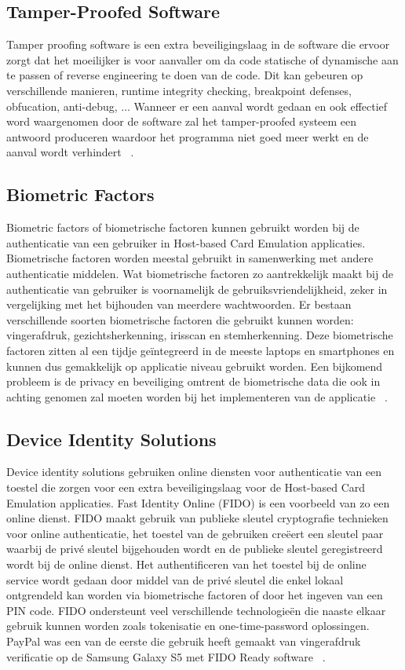 \subsection{Tamper-Proofed Software}
Tamper proofing software is een extra beveiligingslaag in de software die ervoor zorgt dat het moeilijker is voor aanvaller om da code statische of dynamische aan te passen of reverse engineering te doen van de code. Dit kan gebeuren op verschillende manieren, runtime integrity checking, breakpoint defenses,  obfucation, anti-debug, ... Wanneer er een aanval wordt gedaan en ook effectief word waargenomen door de software zal het tamper-proofed systeem een antwoord produceren waardoor het programma niet goed meer werkt en de aanval wordt verhindert ~\autocite{SCA2014}.

\subsection{Biometric Factors}
Biometric factors of biometrische factoren kunnen gebruikt worden bij de authenticatie van een gebruiker in Host-based Card Emulation applicaties. Biometrische factoren worden meestal gebruikt in samenwerking met andere authenticatie middelen. Wat biometrische factoren zo aantrekkelijk maakt bij de authenticatie van gebruiker is voornamelijk de gebruiksvriendelijkheid, zeker in vergelijking met het bijhouden van meerdere wachtwoorden. Er bestaan verschillende soorten biometrische factoren die gebruikt kunnen worden: vingerafdruk, gezichtsherkenning, irisscan en stemherkenning. Deze biometrische factoren zitten al een tijdje geïntegreerd in de meeste laptops en smartphones en kunnen dus gemakkelijk op applicatie niveau gebruikt worden. Een bijkomend probleem is de privacy en beveiliging omtrent de biometrische data die ook in achting genomen zal moeten worden bij het implementeren van de applicatie ~\autocite{SCA2014}.

\subsection{Device Identity Solutions}
Device identity solutions gebruiken online diensten voor authenticatie van een toestel die zorgen voor een extra beveiligingslaag voor de Host-based Card Emulation applicaties. Fast Identity Online (FIDO) is een voorbeeld van zo een online dienst. FIDO maakt gebruik van publieke sleutel cryptografie technieken voor online authenticatie, het toestel van de gebruiken creëert een sleutel paar waarbij de privé sleutel bijgehouden wordt en de publieke sleutel geregistreerd wordt bij de online dienst. Het authentificeren van het toestel bij de online service wordt gedaan door middel van de privé sleutel die enkel lokaal ontgrendeld kan worden via biometrische factoren of door het ingeven van een PIN code.
FIDO ondersteunt veel verschillende technologieën die naaste elkaar gebruik kunnen worden zoals tokenisatie en one-time-password oplossingen. PayPal was een van de eerste die gebruik heeft gemaakt van vingerafdruk verificatie op de Samsung Galaxy S5 met FIDO Ready software ~\autocite{SCA2014}.

